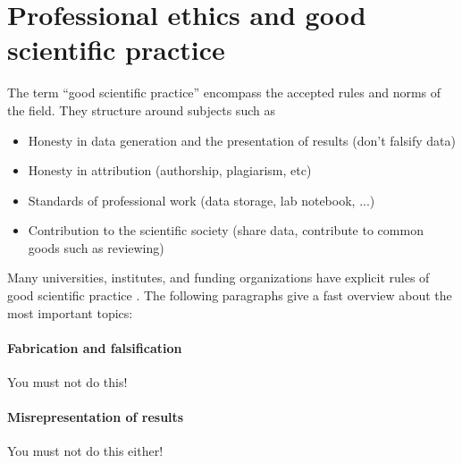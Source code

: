 \documentclass{tufte-book}
\begin{document}
\section{Professional ethics and good scientific practice}

The term ``good scientific practice'' encompass the accepted rules and norms of the field. They structure around subjects such as 

\begin{itemize}
\item Honesty in data generation and the presentation of results (don't falsify data)
\item Honesty in attribution (authorship, plagiarism, etc)
\item Standards of professional work (data storage, lab notebook, ...)
\item Contribution to the scientific society (share data, contribute to common goods such as reviewing)
\end{itemize}

Many
 universities, institutes, and funding organizations have explicit rules of good scientific practice \citet[e.g.][]{Forschungsgemeinschaft-RulesGoodScientific-2013}. The following paragraphs give a fast overview about the most important topics:


\paragraph{Fabrication and falsification} You must not do this!

\paragraph{Misrepresentation of results} You must not do this either!
\end{document}
